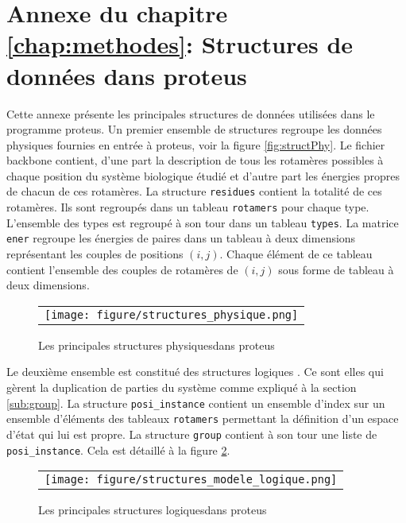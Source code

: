 \chapter*{Annexe du chapitre \ref{chap:methodes}: Structures de données dans proteus}
\label{chap:annexeproteus}

Cette annexe présente les principales structures de données utilisées dans le programme proteus. Un premier ensemble de structures regroupe les données physiques fournies en entrée à proteus, voir la figure \vref{fig:structPhy}. Le fichier backbone contient, d'une part la description de tous les rotamères possibles à chaque position du système biologique étudié et d'autre part les énergies propres de chacun de ces rotamères. La structure \verb!residues! contient la totalité de ces rotamères. Ils sont regroupés dans un tableau \verb!rotamers!  pour chaque type. L'ensemble des types est regroupé à son tour dans un tableau \verb!types!. La matrice \verb!ener! regroupe les énergies de paires dans un tableau à deux dimensions représentant les couples de positions $(i,j)$. Chaque élément de ce tableau contient l'ensemble des couples de rotamères de $(i,j)$  sous forme de tableau à deux dimensions.
   \begin{figure}[!htbp]
     \centering
     \begin{tabular}{c}
       \texttt{[image: figure/structures\_physique.png]} 
     \end{tabular}
     
     \caption{Les principales structures \og physiques\fg dans proteus}
\label{fig:structPhy}
   \end{figure}

Le deuxième ensemble est constitué des structures \og logiques \fg. Ce sont elles qui gèrent la duplication de parties du système comme expliqué à la section \vref{sub:group}. La structure \verb!posi_instance! contient un ensemble d'index sur un ensemble d'éléments des tableaux \verb!rotamers! permettant la définition d'un espace d'état qui lui est propre. La structure \verb!group! contient à son tour une liste de \verb!posi_instance!. Cela est détaillé à la figure  \ref{fig:structLog}.    
   \begin{figure}[!htbp]
     \centering
     \begin{tabular}{c}
       \texttt{[image: figure/structures\_modele\_logique.png]} 
     \end{tabular}
     
     \caption{Les principales structures \og logiques\fg dans proteus}
\label{fig:structLog}
   \end{figure}

